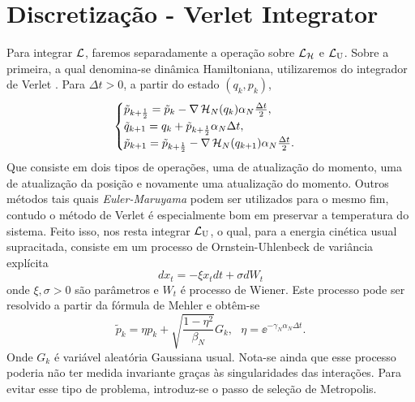 \section{Discretização - Verlet Integrator}

Para integrar $\operatorname{\mathcal{L}}$, faremos separadamente a operação sobre $\operatorname{\mathcal{L}}_{\operatorname{\mathcal{H}}}$ e $\operatorname{\mathcal{L}}_{\operatorname{U}}$. Sobre a primeira, a qual denomina-se dinâmica Hamiltoniana, utilizaremos do integrador de Verlet \cite{Chafa2018}\cite{leimmolecular}. Para $\Delta t > 0$, a partir do estado $(q_k, p_k)$,
\begin{equation}
\begin{cases}
	\tilde{p}_{k+\frac{1}{2}} = \tilde{p}_k - \nabla \operatorname{\mathcal{H}}_N(q_k) \alpha_N \frac{\Delta t}{2}, \\
	\tilde{q}_{k+1} = q_k + \tilde{p}_{k + \frac{1}{2}} \alpha_N \Delta t, \\
	\tilde{p}_{k+1} = \tilde{p}_{k+\frac{1}{2}} - \nabla \operatorname{\mathcal{H}}_N(q_{k+1}) \alpha_N \frac{\Delta t}{2}.
\end{cases}
\label{Equation: Verlet}
\end{equation}
Que consiste em dois tipos de operações, uma de atualização do momento, uma de atualização da posição e novamente uma atualização do momento. Outros métodos tais quais \textit{Euler-Maruyama} \cite[Capítulo~7]{leimmolecular} podem ser utilizados para o mesmo fim, contudo o método de Verlet é especialmente bom em preservar a temperatura do sistema. Feito isso, nos resta integrar $\operatorname{\mathcal{L}}_{\operatorname{U}}$, o qual, para a energia cinética usual supracitada, consiste em um processo de Ornstein-Uhlenbeck de variância explícita $$dx_t = - \xi x_t dt + \sigma dW_t$$ onde $\xi, \sigma > 0$ são parâmetros e $W_t$ é processo de Wiener. Este processo pode ser resolvido a partir da fórmula de Mehler e obtêm-se
\begin{equation}
\tilde{p}_k = \eta p_k + \sqrt{\frac{1-\eta^2}{\beta_N}} G_k, \ \ \ \eta = \ee^{-\gamma_N \alpha_N \Delta t}.
\label{Equation: Mehler}
\end{equation}
Onde $G_k$ é variável aleatória Gaussiana usual. Nota-se ainda que esse processo poderia não ter medida invariante graças às singularidades das interações. Para evitar esse tipo de problema, introduz-se o passo de seleção de Metropolis.

